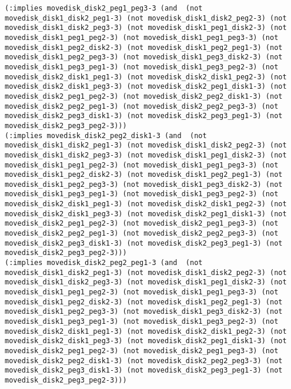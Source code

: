 \documentclass[12pt,letterpaper]{ntdhw}
\begin{document}
\begin{enumerate}
\begin{enumerate}
\begin{lstlisting}[language=pddl, style=pddlstyle,
  basicstyle=\scriptsize]
(:implies movedisk_disk2_peg1_peg3-3 (and  (not movedisk_disk1_disk2_peg1-3) (not movedisk_disk1_disk2_peg2-3) (not movedisk_disk1_disk2_peg3-3) (not movedisk_disk1_peg1_disk2-3) (not movedisk_disk1_peg1_peg2-3) (not movedisk_disk1_peg1_peg3-3) (not movedisk_disk1_peg2_disk2-3) (not movedisk_disk1_peg2_peg1-3) (not movedisk_disk1_peg2_peg3-3) (not movedisk_disk1_peg3_disk2-3) (not movedisk_disk1_peg3_peg1-3) (not movedisk_disk1_peg3_peg2-3) (not movedisk_disk2_disk1_peg1-3) (not movedisk_disk2_disk1_peg2-3) (not movedisk_disk2_disk1_peg3-3) (not movedisk_disk2_peg1_disk1-3) (not movedisk_disk2_peg1_peg2-3) (not movedisk_disk2_peg2_disk1-3) (not movedisk_disk2_peg2_peg1-3) (not movedisk_disk2_peg2_peg3-3) (not movedisk_disk2_peg3_disk1-3) (not movedisk_disk2_peg3_peg1-3) (not movedisk_disk2_peg3_peg2-3)))
(:implies movedisk_disk2_peg2_disk1-3 (and  (not movedisk_disk1_disk2_peg1-3) (not movedisk_disk1_disk2_peg2-3) (not movedisk_disk1_disk2_peg3-3) (not movedisk_disk1_peg1_disk2-3) (not movedisk_disk1_peg1_peg2-3) (not movedisk_disk1_peg1_peg3-3) (not movedisk_disk1_peg2_disk2-3) (not movedisk_disk1_peg2_peg1-3) (not movedisk_disk1_peg2_peg3-3) (not movedisk_disk1_peg3_disk2-3) (not movedisk_disk1_peg3_peg1-3) (not movedisk_disk1_peg3_peg2-3) (not movedisk_disk2_disk1_peg1-3) (not movedisk_disk2_disk1_peg2-3) (not movedisk_disk2_disk1_peg3-3) (not movedisk_disk2_peg1_disk1-3) (not movedisk_disk2_peg1_peg2-3) (not movedisk_disk2_peg1_peg3-3) (not movedisk_disk2_peg2_peg1-3) (not movedisk_disk2_peg2_peg3-3) (not movedisk_disk2_peg3_disk1-3) (not movedisk_disk2_peg3_peg1-3) (not movedisk_disk2_peg3_peg2-3)))
(:implies movedisk_disk2_peg2_peg1-3 (and  (not movedisk_disk1_disk2_peg1-3) (not movedisk_disk1_disk2_peg2-3) (not movedisk_disk1_disk2_peg3-3) (not movedisk_disk1_peg1_disk2-3) (not movedisk_disk1_peg1_peg2-3) (not movedisk_disk1_peg1_peg3-3) (not movedisk_disk1_peg2_disk2-3) (not movedisk_disk1_peg2_peg1-3) (not movedisk_disk1_peg2_peg3-3) (not movedisk_disk1_peg3_disk2-3) (not movedisk_disk1_peg3_peg1-3) (not movedisk_disk1_peg3_peg2-3) (not movedisk_disk2_disk1_peg1-3) (not movedisk_disk2_disk1_peg2-3) (not movedisk_disk2_disk1_peg3-3) (not movedisk_disk2_peg1_disk1-3) (not movedisk_disk2_peg1_peg2-3) (not movedisk_disk2_peg1_peg3-3) (not movedisk_disk2_peg2_disk1-3) (not movedisk_disk2_peg2_peg3-3) (not movedisk_disk2_peg3_disk1-3) (not movedisk_disk2_peg3_peg1-3) (not movedisk_disk2_peg3_peg2-3)))

\end{lstlisting}
\end{enumerate}
\end{enumerate}
\end{document}
